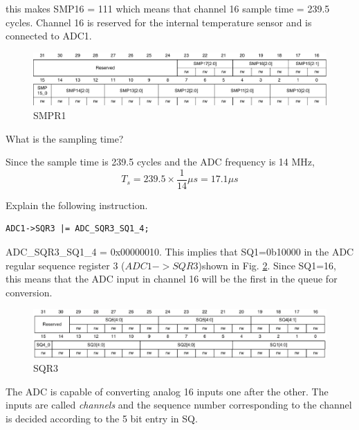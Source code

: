 \documentclass[journal,12pt,twocolumn]{IEEEtran}
\begin{document}
this makes SMP16 = 111 which means that channel 16 sample time = 239.5 cycles.  Channel 16 is reserved for the internal temperature 
sensor and is connected to ADC1.
%
\begin{figure}
\centering
\includegraphics[width=\columnwidth]{./figs/smpr1.eps}
\caption{SMPR1}
\label{fig:smpr1}
\end{figure}
%
\begin{problem}
What is the sampling time?
\end{problem}
\solution Since the sample time is 239.5 cycles and the ADC frequency is 14 MHz, 
\begin{equation}
T_{s} = 239.5 \times \frac{1}{14} \mu s = 17.1 \mu s 
\end{equation}
\begin{problem}
Explain the following instruction.
\begin{lstlisting}
ADC1->SQR3 |= ADC_SQR3_SQ1_4;
\end{lstlisting}
\end{problem}
\solution ADC\_SQR3\_SQ1\_4 = 0x00000010.  This implies that SQ1=0b10000 in
the ADC regular sequence register 3 ($ADC1->SQR3$)shown in Fig. \ref{fig:sqr3}. Since SQ1=16,
this means that the ADC input in channel 16 will be the first in the queue
for conversion. 
%
\begin{figure}
\centering
\includegraphics[width=\columnwidth]{./figs/sqr3.eps}
\caption{SQR3}
\label{fig:sqr3}
\end{figure}
%
The ADC is capable of converting analog 16 inputs one after the other. 
The inputs are called {\em channels} and the sequence number corresponding 
to the channel
is decided
according to the 5 bit entry in SQ. 
\end{document}
